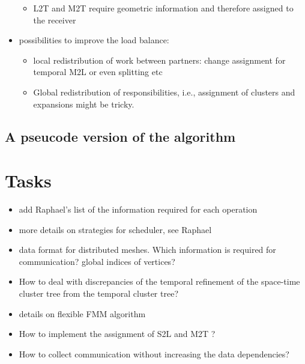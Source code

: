 \documentclass[a4paper]{scrartcl}
\begin{document}
\begin{itemize}
\begin{itemize}
  \item L2T and M2T require geometric information and therefore assigned to the
    receiver
  \end{itemize}
\item possibilities to improve the load balance:
  \begin{itemize}
   \item local redistribution of work between partners: change assignment for
     temporal M2L or even splitting etc 
   \item Global redistribution of responsibilities, i.e., assignment of clusters
     and expansions might be tricky.
  \end{itemize}
\end{itemize}

\subsection{A pseucode version of the algorithm}


\section{Tasks}
\begin{itemize}
\item add Raphael's list of the information required for each operation
\item more details on strategies for scheduler, see Raphael
\item data format for distributed meshes. Which information is required for
  communication? global indices of vertices?
\item How to deal with discrepancies of the temporal refinement of the
  space-time cluster tree from  the temporal cluster tree?
  \item details on flexible FMM algorithm
  \item How to implement the assignment of S2L and M2T ?
  \item How to collect communication without increasing the data dependencies?
\end{itemize}
\end{document}
